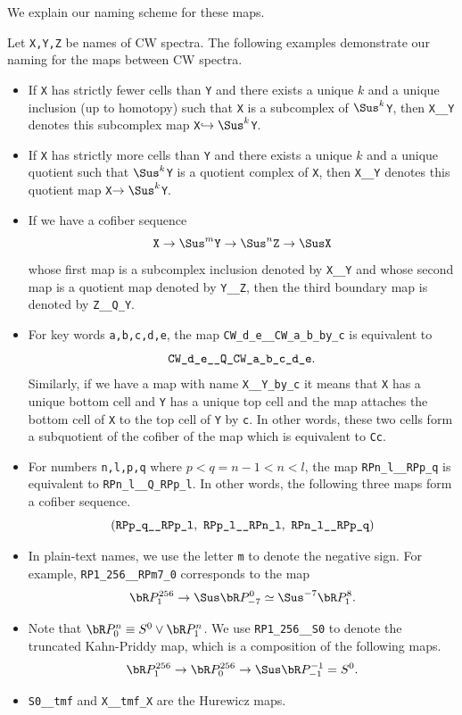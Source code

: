 \documentclass{amsart}
\numberwithin{equation}{section}
\begin{document}
We explain our naming scheme for these maps.
\begin{notation}
    Let \verb|X,Y,Z| be names of CW spectra. The following examples demonstrate our naming for the maps between CW spectra.
    \begin{itemize}
        \item If \verb|X| has strictly fewer cells than \verb|Y| and there exists a unique $k$ and a unique inclusion (up to homotopy) such that \verb|X| is a subcomplex of $\Sus^k$\verb|Y|, then \verb|X__Y| denotes this subcomplex map \verb|X|$\hookrightarrow\Sus^k$\verb|Y|.
        \item If \verb|X| has strictly more cells than \verb|Y| and there exists a unique $k$ and a unique quotient such that $\Sus^k$\verb|Y| is a quotient complex of \verb|X|, then \verb|X__Y| denotes this quotient map \verb|X|$\to\Sus^k$\verb|Y|.
        \item If we have a cofiber sequence
        $$\verb|X|\to \Sus^m\verb|Y|\to \Sus^n\verb|Z|\to \Sus\verb|X|$$
        whose first map is a subcomplex inclusion denoted by \verb|X__Y| and whose second map is a quotient map denoted by \verb|Y__Z|, then the third boundary map is denoted by \verb|Z__Q_Y|.
        \item For key words \verb|a,b,c,d,e|, the map \verb|CW_d_e__CW_a_b_by_c| is equivalent to 
        $$\verb|CW_d_e__Q_CW_a_b_c_d_e|.$$
        Similarly, if we have a map with name \verb|X__Y_by_c| it means that \verb|X| has a unique bottom cell and \verb|Y| has a unique top cell and the map attaches the bottom cell of \verb|X| to the top cell of \verb|Y| by \verb|c|. In other words, these two cells form a subquotient of the cofiber of the map which is equivalent to \verb|Cc|.
        \item For numbers \verb|n,l,p,q| where $p<q=n-1<n<l$, the map \verb|RPn_l__RPp_q| is equivalent to \verb|RPn_l__Q_RPp_l|. In other words, the following three maps form a cofiber sequence.
        $$(\verb|RPp_q__RPp_l|,~\verb|RPp_l__RPn_l|,~\verb|RPn_l__RPp_q|)$$
        \item In plain-text names, we use the letter \verb|m| to denote the negative sign. For example, \verb|RP1_256__RPm7_0| corresponds to the map
        $$\bR P_1^{256}\to \Sus \bR P_{-7}^0\simeq \Sus^{-7}\bR P_1^8.$$
        \item Note that $\bR P_0^n\equiv S^0\vee \bR P_1^n$. We use \verb|RP1_256__S0| to denote the truncated Kahn-Priddy map, which is a composition of the following maps.
        $$\bR P_1^{256}\to \bR P_0^{256}\to \Sus \bR P_{-1}^{-1}=S^0.$$
        \item \verb|S0__tmf| and \verb|X__tmf_X| are the Hurewicz maps.
    \end{itemize}
\end{notation}
\end{document}
